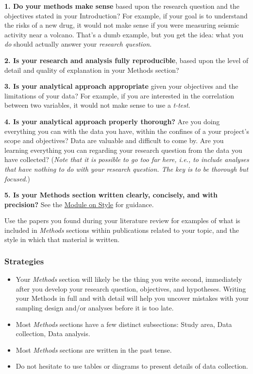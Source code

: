 \documentclass[
]{book}
\begin{document}
\textbf{1. Do your methods make sense} based upon the research question and the objectives stated in your Introduction? For example, if your goal is to understand the risks of a new drug, it would not make sense if you were measuring seismic activity near a volcano. That's a dumb example, but you get the idea: what you \emph{do} should actually answer your \emph{research question}.

\textbf{2. Is your research and analysis fully reproducible}, based upon the level of detail and quality of explanation in your Methods section?

\textbf{3. Is your analytical approach appropriate} given your objectives and the limitations of your data? For example, if you are interested in the correlation between two variables, it would not make sense to use a \emph{t-test}.

\textbf{4. Is your analytical approach properly thorough?} Are you doing everything you can with the data you have, within the confines of a your project's scope and objectives? Data are valuable and difficult to come by. Are you learning everything you can regarding your research question from the data you have collected? (\emph{Note that it is possible to go too far here, i.e., to include analyses that have nothing to do with your research question. The key is to be thorough but focused.})

\textbf{5. Is your Methods section written clearly, concisely, and with precision?} See the \protect\hyperlink{style}{Module on Style} for guidance.

Use the papers you found during your literature review for examples of what is included in \emph{Methods} sections within publications related to your topic, and the style in which that material is written.

\hypertarget{strategies-2}{%
\subsubsection*{Strategies}\label{strategies-2}}

\begin{itemize}
\item
  Your \emph{Methods} section will likely be the thing you write second, immediately after you develop your research question, objectives, and hypotheses. Writing your Methods in full and with detail will help you uncover mistakes with your sampling design and/or analyses before it is too late.
\item
  Most \emph{Methods} sections have a few distinct subsections: Study area, Data collection, Data analysis.
\item
  Most \emph{Methods} sections are written in the past tense.
\item
  Do not hesitate to use tables or diagrams to present details of data collection.
\end{itemize}
\end{document}
